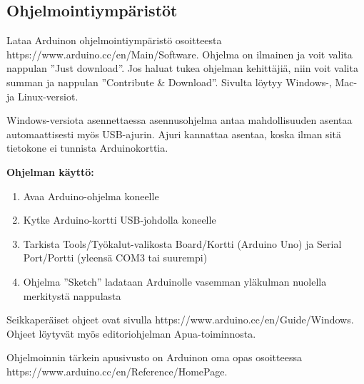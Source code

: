 \subsection*{Ohjelmointiympäristöt}

Lataa Arduinon ohjelmointiympäristö osoitteesta https://www.arduino.cc/en/Main/Software. Ohjelma on ilmainen ja voit valita nappulan ”Just download”. Jos haluat tukea ohjelman kehittäjiä, niin voit valita summan ja nappulan ”Contribute \& Download”. Sivulta löytyy Windows-, Mac- ja Linux-versiot.

Windows-versiota asennettaessa asennusohjelma antaa mahdollisuuden asentaa automaattisesti myös USB-ajurin. Ajuri kannattaa asentaa, koska ilman sitä tietokone ei tunnista Arduinokorttia.



\begin{center}
\begin{fminipage}{10cm}
\textbf{Ohjelman käyttö:}
\begin{enumerate}
    \item Avaa Arduino-ohjelma koneelle 
    \item Kytke Arduino-kortti USB-johdolla koneelle
    \item Tarkista Tools/Työkalut-valikosta Board/Kortti (Arduino Uno) ja Serial Port/Portti (yleensä COM3 tai suurempi)
    \item Ohjelma ”Sketch” ladataan Arduinolle vasemman yläkulman nuolella merkitystä nappulasta

\end{enumerate}
\end{fminipage}
\end{center}

Seikkaperäiset ohjeet ovat sivulla https://www.arduino.cc/en/Guide/Windows. Ohjeet löytyvät myös editoriohjelman Apua-toiminnosta.
\begin{center}
\begin{fminipage}{10cm}
    Ohjelmoinnin tärkein apusivusto on Arduinon oma opas osoitteessa https://www.arduino.cc/en/Reference/HomePage.
\end{fminipage}
\end{center}


